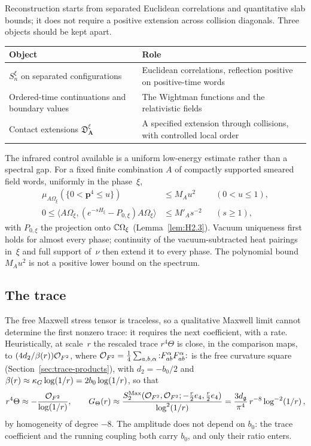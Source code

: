 Reconstruction starts from separated Euclidean correlations and quantitative slab bounds; it does not require a positive extension across collision diagonals. Three objects should be kept apart.
\begin{center}\small
\begin{tabular}{@{}p{}p{}@{}}
\toprule
Object & Role\\
\midrule
$S_n^\xi$ on separated configurations & Euclidean correlations, reflection positive on positive-time words\\
Ordered-time continuations and boundary values & The Wightman functions and the relativistic fields\\
Contact extensions $\mathfrak D^\xi_{\boldsymbol A}$ & A specified extension through collisions, with controlled local order\\
\bottomrule
\end{tabular}
\end{center}
The infrared control available is a uniform low-energy estimate rather than a spectral gap. For a fixed finite combination $A$ of compactly supported smeared field words, uniformly in the phase~$\xi$,
\begin{align*}
\mu_{A\Omega_\xi}(\{0<\mathbf p^4\le u\})&\le M_Au^2&&(0<u\le1),\\
0\le\langle A\Omega_\xi,(e^{-sH_\xi}-P_{0,\xi})A\Omega_\xi\rangle&\le M'_As^{-2}&&(s\ge1),
\end{align*}
with $P_{0,\xi}$ the projection onto $\mathbb{C}\Omega_\xi$ (Lemma~\ref{lem:H2.3}). Vacuum uniqueness first holds for almost every phase; continuity of the vacuum-subtracted heat pairings in~$\xi$ and full support of~$\nu$ then extend it to every phase. The polynomial bound $M_Au^2$ is not a positive lower bound on the spectrum.

\subsection{The trace}\label{sec:strategy-trace}

The free Maxwell stress tensor is traceless, so a qualitative Maxwell limit cannot determine the first nonzero trace: it requires the next coefficient, with a rate. Heuristically, at scale~$r$ the rescaled trace $r^4\Theta$ is close, in the comparison maps, to $(4d_2/\beta(r))\mathcal{O}_{F^2}$, where $\mathcal{O}_{F^2}=\frac14\sum_{a,b,\alpha}{:}F^\alpha_{ab}F^\alpha_{ab}{:}$ is the free curvature square (Section~\ref{sec:trace-products}), with $d_2=-b_0/2$ and $\beta(r)\approx\kappa_G\log(1/r)=2b_0\log(1/r)$, so that
\begin{equation*}
r^4\Theta\approx-\frac{\mathcal{O}_{F^2}}{\log(1/r)},\qquad
G_{\Theta}(r)\approx\frac{S^{\mathrm{Max}}_2(\mathcal{O}_{F^2},\mathcal{O}_{F^2};-\tfrac r2e_4,\tfrac r2e_4)}{\log^2(1/r)}=\frac{3d_{\mathfrak{g}}}{\pi^4}\,r^{-8}\log^{-2}(1/r)\,,
\end{equation*}
by homogeneity of degree $-8$. The amplitude does not depend on $b_0$: the trace coefficient and the running coupling both carry $b_0$, and only their ratio enters.

